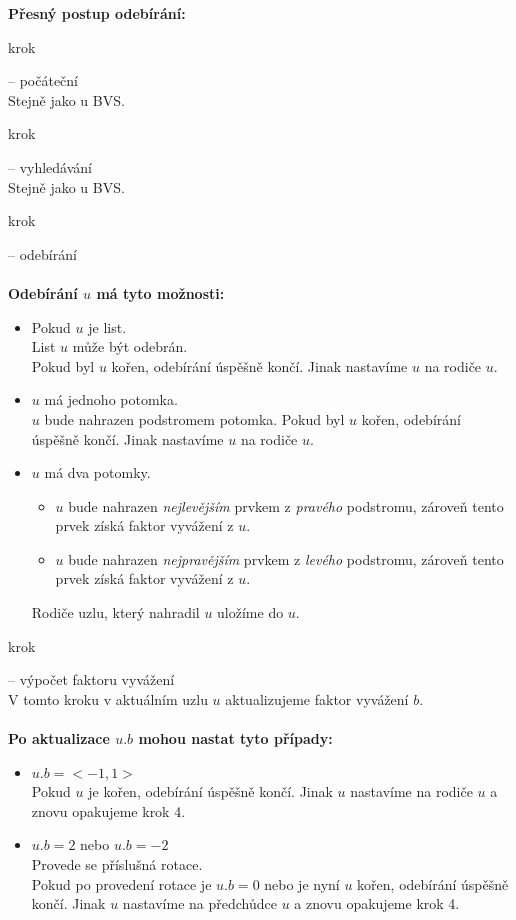 \documentclass[
  biblatex=false,
  font=serif,
  glossaries=false,
  tables=false,
  theorems=false,
  index
]{kidiplom}
\begin{document}
\newpage
\noindent \textbf{Přesný postup odebírání:}
\begin{enumerate} {\bfseries
\item  krok} -- počáteční \\
Stejně jako u BVS.
{\bfseries\item  krok} -- vyhledávání \\
Stejně jako u BVS.
{\bfseries\item  krok} -- odebírání \\\\
\textbf{Odebírání $u$ má tyto možnosti:}
\begin{itemize}
\item Pokud $u$ je list. \\
List $u$ může být odebrán. \\
Pokud byl $u$ kořen, odebírání úspěšně končí. Jinak nastavíme $u$ na rodiče $u$.
\item $u$ má jednoho potomka. \\
$u$ bude nahrazen podstromem potomka.
Pokud byl $u$ kořen, odebírání úspěšně končí. Jinak nastavíme $u$ na rodiče $u$.
\item $u$ má dva potomky. 
\begin{itemize}
\item $u$ bude nahrazen \textit{nejlevějším} prvkem z \textit{pravého} podstromu, zároveň tento prvek získá faktor vyvážení z $u$.
\item $u$ bude nahrazen \textit{nejpravějším} prvkem z \textit{levého} podstromu, zároveň tento prvek získá faktor vyvážení z $u$.
\end{itemize}
Rodiče uzlu, který nahradil $u$ uložíme do $u$.
\end{itemize}
{\bfseries\item  krok} -- výpočet faktoru vyvážení \\
V tomto kroku v aktuálním uzlu $u$ aktualizujeme faktor vyvážení $b$.\\\\
\textbf{Po aktualizace $u.b$ mohou nastat tyto případy:}
\begin{itemize}
\item $u.b = <-1,1>$\\
Pokud $u$ je kořen, odebírání úspěšně končí. Jinak $u$ nastavíme na rodiče $u$ a znovu opakujeme krok 4.
\item $u.b = 2$ nebo $u.b = -2$\\
Provede se příslušná rotace.\\
Pokud po provedení rotace je $u.b = 0$ nebo je nyní $u$ kořen, odebírání úspěšně končí. Jinak $u$ nastavíme na předchůdce $u$ a znovu opakujeme krok 4.
\end{itemize}
\end{enumerate}
\end{document}
